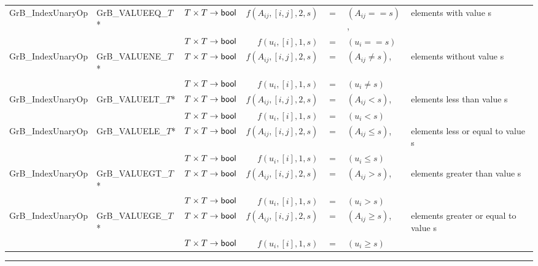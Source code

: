 \begin{landscape}
\begin{table*}
\begin{threeparttable}
\begin{tabular}{l|l|l|rcll}
{\sf GrB\_IndexUnaryOp}   & {\sf GrB\_VALUEEQ\_$T$}*  & $T \times T \rightarrow {\sf bool} $ & $f(A_{ij},[i,j],2,s)$ & $=$ & $(A_{ij} == s)$, & elements with value s \\
                          &                            & $T \times T \rightarrow {\sf bool} $ & $f(u_{i},[i],1,s)$ & $=$ & $(u_{i} == s)$ \\
{\sf GrB\_IndexUnaryOp}   & {\sf GrB\_VALUENE\_$T$}*  & $T \times T \rightarrow {\sf bool} $ & $f(A_{ij},[i,j],2,s)$ & $=$ & $(A_{ij} \neq s)$, & elements without value s \\
                          &                            & $T \times T \rightarrow {\sf bool} $ & $f(u_{i},[i],1,s)$ & $=$ & $(u_{i} \neq s)$ \\
{\sf GrB\_IndexUnaryOp}   & {\sf GrB\_VALUELT\_$T$}*  & $T \times T \rightarrow {\sf bool} $ & $f(A_{ij},[i,j],2,s)$ & $=$ & $(A_{ij} < s)$, & elements less than value s \\
                          &                            & $T \times T \rightarrow {\sf bool} $ & $f(u_{i},[i],1,s)$ & $=$ & $(u_{i} < s)$ \\
{\sf GrB\_IndexUnaryOp}   & {\sf GrB\_VALUELE\_$T$}*  & $T \times T \rightarrow {\sf bool} $ & $f(A_{ij},[i,j],2,s)$ & $=$ & $(A_{ij} \leq s)$, & elements less or equal to value s \\
                          &                            & $T \times T \rightarrow {\sf bool} $ & $f(u_{i},[i],1,s)$ & $=$ & $(u_{i} \leq s)$ \\
{\sf GrB\_IndexUnaryOp}   & {\sf GrB\_VALUEGT\_$T$}*  & $T \times T \rightarrow {\sf bool} $ & $f(A_{ij},[i,j],2,s)$ & $=$ & $(A_{ij} > s)$, & elements greater than value s \\
                          &                            & $T \times T \rightarrow {\sf bool} $ & $f(u_{i},[i],1,s)$ & $=$ & $(u_{i} > s)$ \\
{\sf GrB\_IndexUnaryOp}   & {\sf GrB\_VALUEGE\_$T$}*  & $T \times T \rightarrow {\sf bool} $ & $f(A_{ij},[i,j],2,s)$ & $=$ & $(A_{ij} \geq s)$, & elements greater or equal to value s \\
                          &                            & $T \times T \rightarrow {\sf bool} $ & $f(u_{i},[i],1,s)$ & $=$ & $(u_{i} \geq s)$ \\
\end{tabular}
\hrule
\end{threeparttable}
\end{table*}

\end{landscape}

